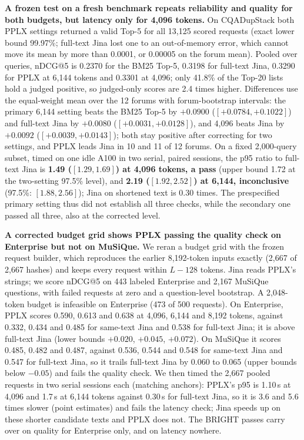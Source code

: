 \documentclass[conference]{IEEEtran}
\begin{document}
{

\textbf{A frozen test on a fresh benchmark repeats reliability and quality for both budgets, but latency only for 4,096 tokens.} On CQADupStack both PPLX settings returned a valid Top-5 for all 13,125 scored requests (exact lower bound 99.97\%; full-text Jina lost one to an out-of-memory error, which cannot move its mean by more than 0.0001, or 0.00005 on the forum mean). Pooled over queries, nDCG@5 is 0.2370 for the BM25 Top-5, 0.3198 for full-text Jina, 0.3290 for PPLX at 6,144 tokens and 0.3301 at 4,096; only 41.8\% of the Top-20 lists hold a judged positive, so judged-only scores are 2.4 times higher. Differences use the equal-weight mean over the 12 forums with forum-bootstrap intervals: the primary 6,144 setting beats the BM25 Top-5 by $+0.0900$ ($[+0.0784,+0.1022]$) and full-text Jina by $+0.0080$ ($[+0.0031,+0.0128]$), and 4,096 beats Jina by $+0.0092$ ($[+0.0039,+0.0143]$); both stay positive after correcting for two settings, and PPLX leads Jina in 10 and 11 of 12 forums. On a fixed 2,000-query subset, timed on one idle A100 in two serial, paired sessions, the p95 ratio to full-text Jina is \textbf{1.49 ($[1.29,1.69]$) at 4,096 tokens, a pass} (upper bound 1.72 at the two-setting 97.5\% level), and \textbf{2.19 ($[1.92,2.52]$) at 6,144, inconclusive} (97.5\%: $[1.88,2.56]$); Jina on shortened text is 0.30 times. The prespecified primary setting thus did not establish all three checks, while the secondary one passed all three, also at the corrected level.

\textbf{A corrected budget grid shows PPLX passing the quality check on Enterprise but not on MuSiQue.} We reran a budget grid with the frozen request builder, which reproduces the earlier 8,192-token inputs exactly (2,667 of 2,667 hashes) and keeps every request within $L-128$ tokens. Jina reads PPLX's strings; we score nDCG@5 on 443 labeled Enterprise and 2,167 MuSiQue questions, with failed requests at zero and a question-level bootstrap. A 2,048-token budget is infeasible on Enterprise (473 of 500 requests). On Enterprise, PPLX scores 0.590, 0.613 and 0.638 at 4,096, 6,144 and 8,192 tokens, against 0.332, 0.434 and 0.485 for same-text Jina and 0.538 for full-text Jina; it is above full-text Jina (lower bounds $+0.020$, $+0.045$, $+0.072$). On MuSiQue it scores 0.485, 0.482 and 0.487, against 0.536, 0.544 and 0.548 for same-text Jina and 0.547 for full-text Jina, so it trails full-text Jina by 0.060 to 0.065 (upper bounds below $-0.05$) and fails the quality check. We then timed the 2,667 pooled requests in two serial sessions each (matching anchors): PPLX's p95 is 1.10\,s at 4,096 and 1.7\,s at 6,144 tokens against 0.30\,s for full-text Jina, so it is 3.6 and 5.6 times slower (point estimates) and fails the latency check; Jina speeds up on these shorter candidate texts and PPLX does not. The BRIGHT passes carry over on quality for Enterprise only, and on latency nowhere.

}
\end{document}
